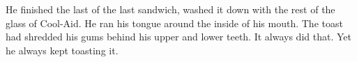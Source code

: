 He finished the last of the last sandwich, washed it down with the rest
of the glass of Cool-Aid. He ran his tongue around the inside of his
mouth. The toast had shredded his gums behind his upper and lower teeth.
It always did that. Yet he always kept toasting it.
